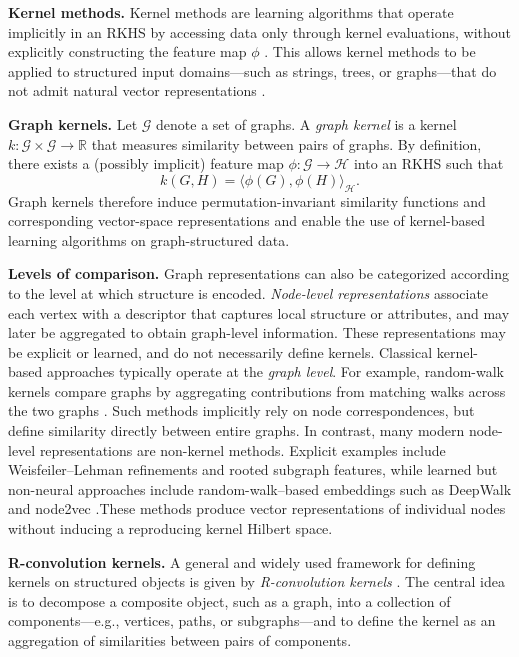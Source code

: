 \textbf{Kernel methods.}
Kernel methods are learning algorithms that operate implicitly in an RKHS by
accessing data only through kernel evaluations, without explicitly constructing
the feature map $\phi$ \citep{scholkopf2001learning,soton259580}. This allows
kernel methods to be applied to structured input domains—such as strings,
trees, or graphs—that do not admit natural vector representations
\citep{gartner2003graph}.

\textbf{Graph kernels.}
Let $\mathcal{G}$ denote a set of graphs.
A \emph{graph kernel} is a kernel
$k:\mathcal{G}\times\mathcal{G}\to\mathbb{R}$ that measures similarity between
pairs of graphs. By definition, there exists a (possibly implicit) feature map
$\phi:\mathcal{G}\to\mathcal{H}$ into an RKHS such that
\[
k(G,H)=\langle \phi(G),\phi(H)\rangle_{\mathcal{H}}.
\]
Graph kernels therefore induce permutation-invariant
similarity functions and corresponding vector-space representations and enable the use of kernel-based learning algorithms
on graph-structured data.

\textbf{Levels of comparison.}
Graph representations can also be categorized according to the level at which
structure is encoded.
\emph{Node-level representations} associate each vertex with a descriptor that
captures local structure or attributes, and may later be aggregated to obtain
graph-level information. These representations may be explicit or learned, and
do not necessarily define kernels.
Classical kernel-based approaches typically operate at the \emph{graph level}. For example, random-walk kernels compare graphs by aggregating contributions from matching walks across the two graphs \citep{kashima2003marginalized,gartner2003graph}.
Such methods implicitly rely on node correspondences, but define similarity directly between entire graphs.
In contrast, many modern node-level representations are non-kernel methods.
Explicit examples include Weisfeiler--Lehman refinements and rooted subgraph features, while learned but non-neural approaches include random-walk–based embeddings such as DeepWalk \citep{perozzi2014deepwalk} and node2vec \citep{grover2016node2vec}.These methods produce vector representations of individual nodes without inducing a reproducing kernel
Hilbert space.

\textbf{R-convolution kernels.}
A general and widely used framework for defining kernels on structured objects
is given by \emph{R-convolution kernels} \citep{haussler1999}.
The central idea is to decompose a composite object, such as a graph, into a
collection of components—e.g., vertices, paths, or subgraphs—and to define the
kernel as an aggregation of similarities between pairs of components.

